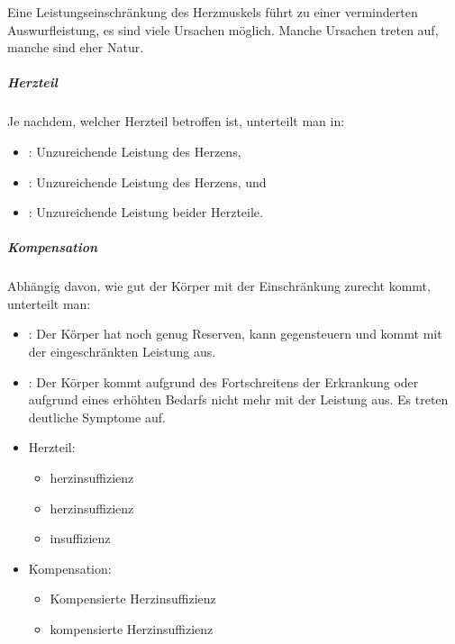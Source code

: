 
Eine Leistungseinschränkung des Herzmuskels führt zu einer
verminderten Auswurfleistung, es sind viele Ursachen
möglich. Manche Ursachen treten  auf, manche sind
eher  Natur.



{
\subparagraph{Herzteil} 
Je nachdem, welcher Herzteil betroffen ist, unterteilt man in:

\begin{itemize}
  \item {}: Unzureichende Leistung des 
  Herzens,
  \item {}:
  Unzureichende Leistung des  Herzens, und
  \item {}: Unzureichende Leistung beider Herzteile.
\end{itemize}

\subparagraph{Kompensation}
Abhängig davon, wie gut der Körper mit der
Einschränkung zurecht kommt, unterteilt man:

\begin{itemize}
  \item {}: Der Körper hat noch
  genug Reserven, kann gegensteuern und kommt mit der
  eingeschränkten Leistung aus.
  \item {}:
  Der Körper kommt aufgrund des Fortschreitens der Erkrankung oder aufgrund eines erhöhten Bedarfs nicht mehr mit der Leistung aus. Es treten deutliche
  Symptome auf.
\end{itemize}
}{
\begin{itemize}
  \item Herzteil:
  \begin{itemize}
    \item {}herzinsuffizienz
    \item {}herzinsuffizienz
    \item {}insuffizienz
  \end{itemize}
  \item Kompensation:
  \begin{itemize}
    \item Kompensierte Herzinsuffizienz
    \item {}kompensierte Herzinsuffizienz
  \end{itemize}
\end{itemize}
}{}{}{}




